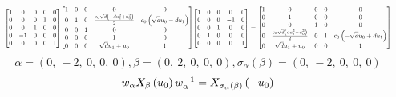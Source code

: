 \documentclass[11pt]{article}
\theoremstyle{definition}
\begin{document}
\[
\scaletoalign{\textwidth}{{\left[\begin{matrix}1 & 0 & 0 & 0 & 0\\0 & 0 & 0 & 1 & 0\\0 & 0 & 1 & 0 & 0\\0 & -1 & 0 & 0 & 0\\0 & 0 & 0 & 0 & 1\end{matrix}\right]} {\left[\begin{matrix}1 & 0 & 0 & 0 & 0\\0 & 1 & 0 & \frac{c_{0} \sqrt{d} \left(- d u_{1}^{2} + u_{0}^{2}\right)}{2} & c_{0} \left(\sqrt{d} u_{0} - d u_{1}\right)\\0 & 0 & 1 & 0 & 0\\0 & 0 & 0 & 1 & 0\\0 & 0 & 0 & \sqrt{d} u_{1} + u_{0} & 1\end{matrix}\right]} {\left[\begin{matrix}1 & 0 & 0 & 0 & 0\\0 & 0 & 0 & -1 & 0\\0 & 0 & 1 & 0 & 0\\0 & 1 & 0 & 0 & 0\\0 & 0 & 0 & 0 & 1\end{matrix}\right]} = {\left[\begin{matrix}1 & 0 & 0 & 0 & 0\\0 & 1 & 0 & 0 & 0\\0 & 0 & 1 & 0 & 0\\0 & \frac{c_{0} \sqrt{d} \left(d u_{1}^{2} - u_{0}^{2}\right)}{2} & 0 & 1 & c_{0} \left(- \sqrt{d} u_{0} + d u_{1}\right)\\0 & \sqrt{d} u_{1} + u_{0} & 0 & 0 & 1\end{matrix}\right]}}
\]
\[
\alpha = \left( 0, \  -2, \  0, \  0, \  0\right), \beta = \left( 0, \  2, \  0, \  0, \  0\right), \sigma_{\alpha}(\beta) = \left( 0, \  -2, \  0, \  0, \  0\right)
\]
\[
\scaletoalign{\textwidth}{w_{\alpha} X_{\beta}\left(u_{0}\right) w_{\alpha}^{-1} = X_{\sigma_{\alpha}\left(\beta\right)}\left(- u_{0}\right)}
\]
\end{document}

